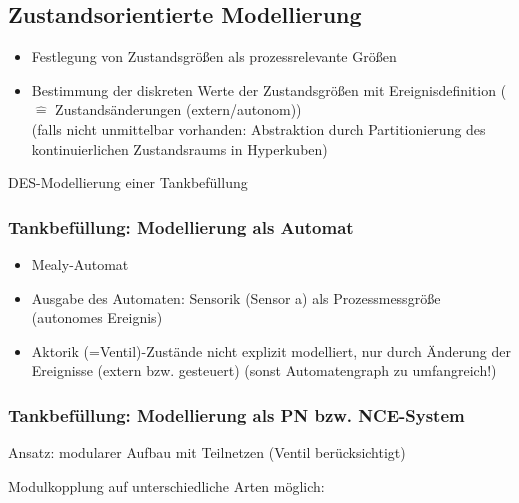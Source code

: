 \subsection{Zustandsorientierte Modellierung}
\begin{itemize}
	\item Festlegung von Zustandsgrößen  als prozessrelevante Größen
	\item Bestimmung der diskreten Werte der Zustandsgrößen mit Ereignisdefinition ($\hat{=}$ Zustandsänderungen (extern/autonom))\\
	(falls nicht unmittelbar vorhanden: Abstraktion durch Partitionierung des kontinuierlichen Zustandsraums in Hyperkuben)
\end{itemize}

 DES-Modellierung einer Tankbefüllung 

\subsubsection{Tankbefüllung: Modellierung als Automat}


\begin{itemize}
	\item Mealy-Automat
	\item Ausgabe des Automaten: Sensorik (Sensor a) als Prozessmessgröße (autonomes Ereignis)
	\item Aktorik (=Ventil)-Zustände nicht explizit modelliert, nur durch Änderung der Ereignisse (extern bzw. gesteuert) (sonst Automatengraph zu umfangreich!)
\end{itemize}

\subsubsection{Tankbefüllung: Modellierung als PN bzw. NCE-System}
Ansatz: modularer Aufbau mit Teilnetzen (Ventil berücksichtigt) 

Modulkopplung auf unterschiedliche Arten möglich:


